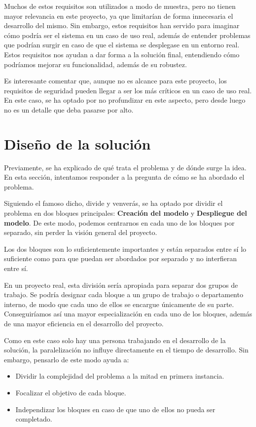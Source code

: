 Muchos de estos requisitos son utilizados a modo de muestra, pero no tienen mayor relevancia en este proyecto, ya que limitarían de forma innecesaria el desarrollo del mismo.
Sin embargo, estos requisitos han servido para imaginar cómo podría ser el sistema en un caso de uso real, además de entender problemas que podrían surgir en caso de que el sistema se desplegase en un entorno real.
Estos requisitos nos ayudan a dar forma a la solución final, entendiendo cómo podríamos mejorar su funcionalidad, además de su robustez.

Es interesante comentar que, aunque no es alcance para este proyecto, los requisitos de seguridad pueden llegar a ser los más críticos en un caso de uso real.
En este caso, se ha optado por no profundizar en este aspecto, pero desde luego no es un detalle que deba pasarse por alto.



\section{Diseño de la solución}\label{sec:diseno}

Previamente, se ha explicado de qué trata el problema y de dónde surge la idea.
En esta sección, intentamos responder a la pregunta de cómo se ha abordado el problema.

Siguiendo el famoso dicho, divide y venverás, se ha optado por dividir el problema en dos bloques principales: \textbf{Creación del modelo} y \textbf{Despliegue del modelo}.
De este modo, podemos centrarnos en cada uno de los bloques por separado, sin perder la visión general del proyecto.

Los dos bloques son lo suficientemente importantes y están separados entre sí lo suficiente como para que puedan ser abordados por separado y no interfieran entre sí.

En un proyecto real, esta división sería apropiada para separar dos grupos de trabajo.
Se podría designar cada bloque a un grupo de trabajo o departamento interno, de modo que cada uno de ellos se encargue únicamente de su parte.
Conseguiríamos así una mayor especialización en cada uno de los bloques, además de una mayor eficiencia en el desarrollo del proyecto.

Como en este caso solo hay una persona trabajando en el desarrollo de la solución, la paralelización no influye directamente en el tiempo de desarrollo.
Sin embargo, pensarlo de este modo ayuda a:

\begin{itemize}\itemsep1pt \parskip0pt 
    \item Dividir la complejidad del problema a la mitad en primera instancia.
    \item Focalizar el objetivo de cada bloque.
    \item Independizar los bloques en caso de que uno de ellos no pueda ser completado.
\end{itemize}

